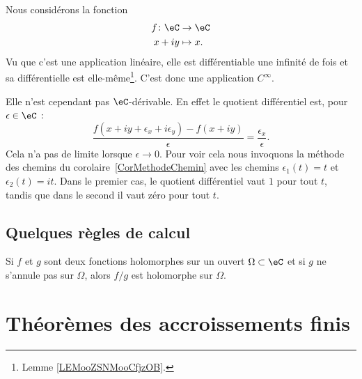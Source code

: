 \begin{example}
	Nous considérons la fonction
	\begin{equation}
		\begin{aligned}
			f\colon \eC & \to \eC    \\
			x+iy        & \mapsto x.
		\end{aligned}
	\end{equation}
	Vu que c'est une application linéaire, elle est différentiable une infinité de fois et sa différentielle est elle-même\footnote{Lemme \ref{LEMooZSNMooCfjzOB}.}. C'est donc une application \( C^{\infty}\).

	Elle n'est cependant pas \( \eC\)-dérivable. En effet le quotient différentiel est, pour \( \epsilon\in \eC\) :
	\begin{equation}
		\frac{ f(x+iy+\epsilon_x+i\epsilon_y)-f(x+iy) }{ \epsilon }=\frac{ \epsilon_x }{ \epsilon }.
	\end{equation}
	Cela n'a pas de limite lorsque \( \epsilon\to 0\). Pour voir cela nous invoquons la méthode des chemins du corolaire~\ref{CorMethodeChemin} avec les chemins \( \epsilon_1(t)=t\) et \( \epsilon_2(t)=it\). Dans le premier cas, le quotient différentiel vaut \( 1\) pour tout \( t\), tandis que dans le second il vaut zéro pour tout \( t\).
\end{example}

\subsection{Quelques règles de calcul}

\begin{lemma}       \label{LEMooVDXOooUyFHXZ}
	Si \( f\) et \( g\) sont deux fonctions holomorphes sur un ouvert \( \Omega\subset \eC\) et si \( g\) ne s'annule pas sur \( \Omega\), alors \( f/g\) est holomorphe sur \( \Omega\).
\end{lemma}


\section{Théorèmes des accroissements finis}		\label{SecThoAccrsFinis}

